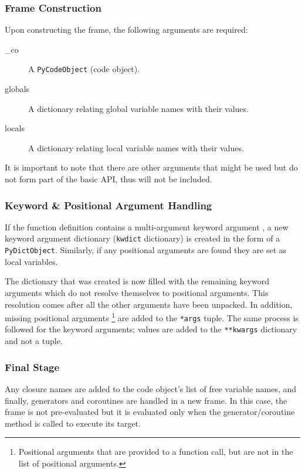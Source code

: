 {			\subsubsection*{Frame Construction}
			\par Upon constructing the frame, the following arguments are required:
			\begin{description}
				\item [\_co] A \lstinline|PyCodeObject| (code object).
				\item [globals] A dictionary relating global variable names with their values.
				\item [locals] A dictionary relating local variable names with their values.
			\end{description}
			It is important to note that there are other arguments that might be used but do not form part of the basic API, thus will not be included.

			\subsubsection*{Keyword \& Positional Argument Handling}
			\par If the function definition contains a multi-argument keyword argument , a new keyword argument dictionary (\lstinline|kwdict| dictionary) is created in the form of a \lstinline|PyDictObject|.
			Similarly, if any positional arguments are found they are set as local variables.

			\par The dictionary that was created is now filled with the remaining keyword arguments which do not resolve themselves to positional arguments. This resolution comes after
			all the other arguments have been unpacked. In addition, missing positional arguments \footnote{Positional arguments that are provided to a function call, but are not in the list of positional arguments.} are 
			added to the \lstinline|*args| tuple. The same process is followed for the keyword arguments; values are added to the \lstinline|**kwargs| dictionary and not a tuple.

			\subsubsection*{Final Stage}
			\par Any closure names are added to the code object's list of free variable names, and finally, generators and coroutines are handled in a new frame. In this case, the frame is not pre-evaluated but it is 
			evaluated only when the generator/coroutine method is called to execute its target.


}
